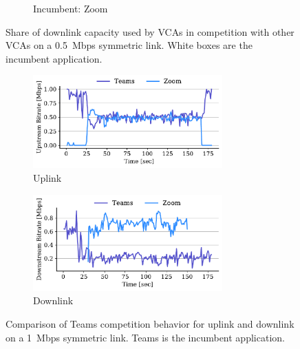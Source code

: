 \begin{figure}[t!]
\begin{subfigure}[t]{.33\textwidth}
    \caption{Incumbent: Zoom}
    \label{fig:zoom-dl-boxplot-0.5}
\end{subfigure}
\caption{Share of downlink capacity used by VCAs in competition with other VCAs on a 0.5~Mbps symmetric link. White boxes are the incumbent application.}
\label{fig:dnld-boxplot}
\end{figure}

\begin{figure}[t!]
\centering
\begin{subfigure}[t]{.5\textwidth}
    \centering
    \includegraphics[width=0.8\textwidth]{figures/comp_ts/teams_zoom_1_ul_r2.pdf}
    \caption{Uplink}
    \label{fig:teams-zoom-up-1}
\end{subfigure}\hfill
\begin{subfigure}[t]{.5\textwidth}
    \centering
    \includegraphics[width=0.8\textwidth]{figures/comp_ts/teams_zoom_1_dl_r2.pdf}
    \caption{Downlink}
    \label{fig:teams-zoom-down-1}
\end{subfigure}
\caption{Comparison of Teams competition behavior for uplink and downlink on a 1~Mbps symmetric link. Teams is the incumbent application.}
\label{fig:teams-zoom-1}
\end{figure}


